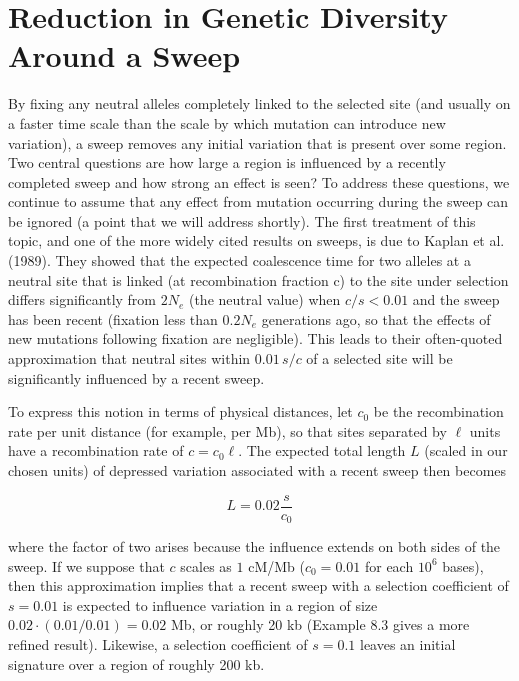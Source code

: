 \documentclass{article}
\begin{document}
\section{Reduction in Genetic Diversity Around a Sweep}
By fixing any neutral alleles completely linked to the selected site (and usually on a faster time scale than the scale by which mutation can introduce new variation), a sweep removes any initial variation that is present over some region. Two central questions are how large a region is influenced by a recently completed sweep and how strong an effect is seen? To address these questions, we continue to assume that any effect from mutation occurring during the sweep can be ignored (a point that we will address shortly). The first treatment of this topic, and one of the more widely cited results on sweeps, is due to Kaplan et al. (1989). They showed that the expected coalescence time for two alleles at a neutral site that is linked (at recombination fraction c) to the site under selection differs significantly from  $ 2N_e $ (the neutral value) when  $ c/s < 0.01 $ and the sweep has been recent (fixation less than  $ 0.2N_e $ generations ago, so that the effects of new mutations following fixation are negligible). This leads to their often-quoted approximation that neutral sites within  $ 0.01\,s/c $ of a selected site will be significantly influenced by a recent sweep.

To express this notion in terms of physical distances, let  $ c_0 $ be the recombination rate per unit distance (for example, per Mb), so that sites separated by  $ \ell $ units have a recombination rate of  $ c = c_0 \ell $. The expected total length  $ L $ (scaled in our chosen units) of depressed variation associated with a recent sweep then becomes

\begin{equation}
L=0.02\frac{s}{c_{0}}
\tag{8.6a}
\label{eq:8_6a}
\end{equation}

where the factor of two arises because the influence extends on both sides of the sweep. If we suppose that $c$ scales as $1$ cM/Mb ($c_0 = 0.01$ for each $10^6$ bases), then this approximation implies that a recent sweep with a selection coefficient of $s = 0.01$ is expected to influence variation in a region of size $0.02 \cdot (0.01 / 0.01) = 0.02$ Mb, or roughly 20 kb (Example 8.3 gives a more refined result). Likewise, a selection coefficient of $s = 0.1$ leaves an initial signature over a region of roughly 200 kb.
\end{document}
